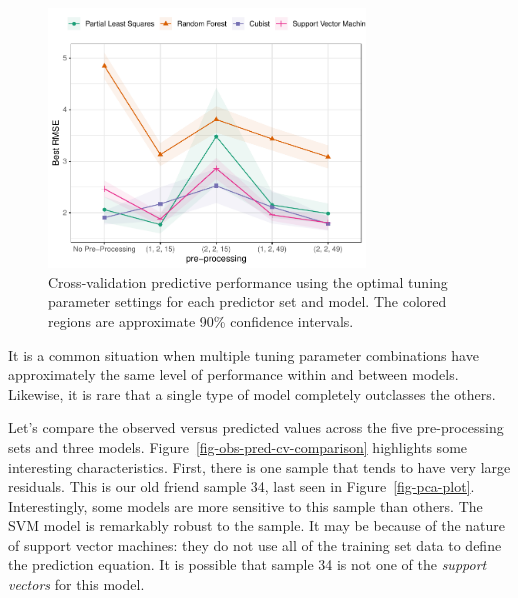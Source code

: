 \documentclass[
  letterpaper,
  DIV=11,
  numbers=noendperiod]{scrartcl}
\begin{document}
\begin{figure}[t!]

{\centering \includegraphics[width=0.75\textwidth,height=\textheight]{figures/fig-all-optimal-models-1.pdf}

}

\caption{\label{fig-all-optimal-models}Cross-validation predictive
performance using the optimal tuning parameter settings for each
predictor set and model. The colored regions are approximate 90\%
confidence intervals.}

\end{figure}

\begin{tcolorbox}[enhanced jigsaw, title=\textcolor{quarto-callout-important-color}{\faExclamation}\hspace{0.5em}{\textbf{WTF} \#12}, rightrule=.15mm, leftrule=.75mm, bottomtitle=1mm, opacityback=0, opacitybacktitle=0.6, bottomrule=.15mm, arc=.35mm, colframe=quarto-callout-important-color-frame, breakable, toprule=.15mm, toptitle=1mm, colback=white, titlerule=0mm, coltitle=black, left=2mm, colbacktitle=quarto-callout-important-color!10!white]

It is a common situation when multiple tuning parameter combinations
have approximately the same level of performance within and between
models. Likewise, it is rare that a single type of model completely
outclasses the others.

\end{tcolorbox}

Let's compare the observed versus predicted values across the five
pre-processing sets and three models.
Figure~\ref{fig-obs-pred-cv-comparison} highlights some interesting
characteristics. First, there is one sample that tends to have very
large residuals. This is our old friend sample 34, last seen in
Figure~\ref{fig-pca-plot}. Interestingly, some models are more sensitive
to this sample than others. The SVM model is remarkably robust to the
sample. It may be because of the nature of support vector machines: they
do not use all of the training set data to define the prediction
equation. It is possible that sample 34 is not one of the \emph{support
vectors} for this model.
\end{document}
